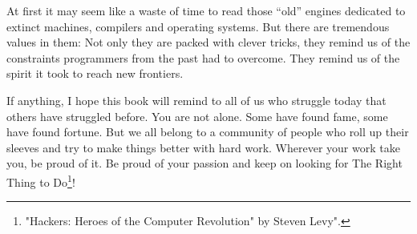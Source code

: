 \documentclass[book.tex]{subfiles}
\begin{document}
\bigskip

At first it may seem like a waste of time to read those ``old'' engines dedicated to extinct machines, compilers and operating systems. But there are tremendous values in them: Not only they are packed with clever tricks, they remind us of the constraints programmers from the past had to overcome. They remind us of the spirit it took to reach new frontiers.\\ 
\par
If anything, I hope this book will remind to all of us who struggle today that others have struggled before. You are not alone. Some have found fame, some have found fortune. But we all belong to a community of people who roll up their sleeves and try to make things better with hard work. Wherever your work take you, be proud of it. Be proud of your passion and keep on looking for The Right Thing to Do\footnote{"Hackers: Heroes of the Computer Revolution" by Steven Levy".}!\\



\end{document}
